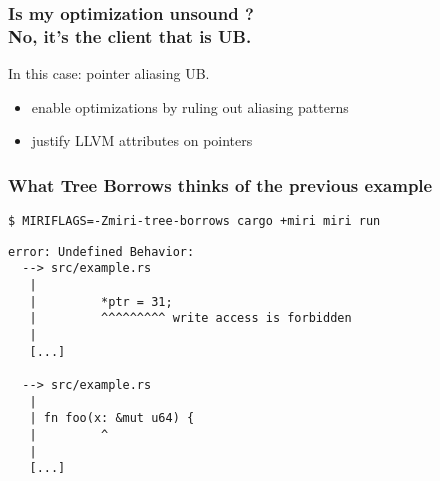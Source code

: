 \begin{frame}
    \frametitle{Is my optimization unsound ?\\No, it's the client that is UB.}
    In this case: pointer aliasing UB.

    \begin{itemize}
        \item enable optimizations by ruling out aliasing patterns
        \item justify LLVM attributes on pointers
    \end{itemize}
\end{frame}

\begin{frame}[fragile]
    \frametitle{What Tree Borrows thinks of the previous example}
    \texttt{\$ MIRIFLAGS=-Zmiri-tree-borrows cargo +miri miri run}
        \begin{lstlisting}
error: Undefined Behavior:
  --> src/example.rs
   |
   |         *ptr = 31;
   |         ^^^^^^^^^ write access is forbidden
   |
   [...]

  --> src/example.rs
   |
   | fn foo(x: &mut u64) {
   |         ^
   |
   [...]
        \end{lstlisting}
\end{frame}


